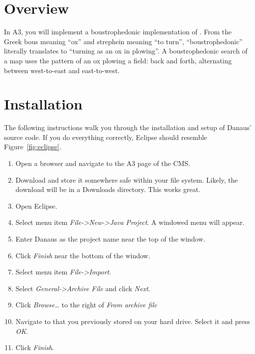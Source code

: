 \documentclass{pset}
\newcommand{\athree}{A3}
\newcommand{\cms}{the CMS}
\begin{document}
\maketitle

\section*{Overview}
In \athree{}, you will implement a boustrophedonic implementation of
. From the Greek bous meaning ``ox'' and strephein meaning ``to
turn'', ``boustrophedonic'' literally translates to ``turning as an ox in
plowing''. A boustrophedonic search of a map uses the pattern of an ox plowing
a field: back and forth, alternating between west-to-east and east-to-west.

\section*{Installation}
The following instructions walk you through the installation and setup of
Danaus' source code. If you do everything correctly, Eclipse should resemble
Figure~\ref{fig:eclipse}.
\begin{enumerate}
  \item Open a browser and navigate to the \athree{} page of \cms{}.
  \item Download  and store it somewhere safe within your
    file system. Likely, the download will be in a Downloads directory. This
    works great.
  \item Open Eclipse.
  \item Select menu item \emph{File->New->Java Project}. A windowed menu will
    appear.
  \item Enter Danaus as the project name near the top of the window.
  \item Click \emph{Finish} near the bottom of the window.
  \item Select menu item \emph{File->Import}.
  \item Select \emph{General->Archive File} and click \emph{Next}.
  \item Click \emph{Browse\ldots} to the right of \emph{From archive file}
  \item  Navigate to  that you previously stored on your
    hard drive. Select it and press \emph{OK}.
  \item  Click \emph{Finish}.
\end{enumerate}
\end{document}
